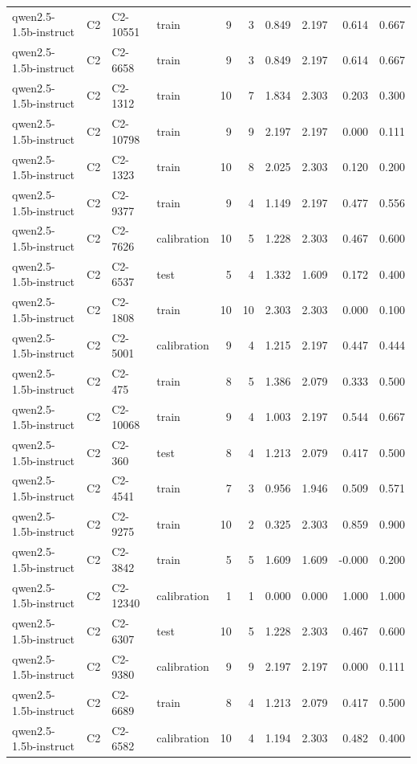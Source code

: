 \begin{table}
\begin{tabular}{llllrrrrrr}
qwen2.5-1.5b-instruct & C2 & C2-10551 & train & 9 & 3 & 0.849 & 2.197 & 0.614 & 0.667 \\
qwen2.5-1.5b-instruct & C2 & C2-6658 & train & 9 & 3 & 0.849 & 2.197 & 0.614 & 0.667 \\
qwen2.5-1.5b-instruct & C2 & C2-1312 & train & 10 & 7 & 1.834 & 2.303 & 0.203 & 0.300 \\
qwen2.5-1.5b-instruct & C2 & C2-10798 & train & 9 & 9 & 2.197 & 2.197 & 0.000 & 0.111 \\
qwen2.5-1.5b-instruct & C2 & C2-1323 & train & 10 & 8 & 2.025 & 2.303 & 0.120 & 0.200 \\
qwen2.5-1.5b-instruct & C2 & C2-9377 & train & 9 & 4 & 1.149 & 2.197 & 0.477 & 0.556 \\
qwen2.5-1.5b-instruct & C2 & C2-7626 & calibration & 10 & 5 & 1.228 & 2.303 & 0.467 & 0.600 \\
qwen2.5-1.5b-instruct & C2 & C2-6537 & test & 5 & 4 & 1.332 & 1.609 & 0.172 & 0.400 \\
qwen2.5-1.5b-instruct & C2 & C2-1808 & train & 10 & 10 & 2.303 & 2.303 & 0.000 & 0.100 \\
qwen2.5-1.5b-instruct & C2 & C2-5001 & calibration & 9 & 4 & 1.215 & 2.197 & 0.447 & 0.444 \\
qwen2.5-1.5b-instruct & C2 & C2-475 & train & 8 & 5 & 1.386 & 2.079 & 0.333 & 0.500 \\
qwen2.5-1.5b-instruct & C2 & C2-10068 & train & 9 & 4 & 1.003 & 2.197 & 0.544 & 0.667 \\
qwen2.5-1.5b-instruct & C2 & C2-360 & test & 8 & 4 & 1.213 & 2.079 & 0.417 & 0.500 \\
qwen2.5-1.5b-instruct & C2 & C2-4541 & train & 7 & 3 & 0.956 & 1.946 & 0.509 & 0.571 \\
qwen2.5-1.5b-instruct & C2 & C2-9275 & train & 10 & 2 & 0.325 & 2.303 & 0.859 & 0.900 \\
qwen2.5-1.5b-instruct & C2 & C2-3842 & train & 5 & 5 & 1.609 & 1.609 & -0.000 & 0.200 \\
qwen2.5-1.5b-instruct & C2 & C2-12340 & calibration & 1 & 1 & 0.000 & 0.000 & 1.000 & 1.000 \\
qwen2.5-1.5b-instruct & C2 & C2-6307 & test & 10 & 5 & 1.228 & 2.303 & 0.467 & 0.600 \\
qwen2.5-1.5b-instruct & C2 & C2-9380 & calibration & 9 & 9 & 2.197 & 2.197 & 0.000 & 0.111 \\
qwen2.5-1.5b-instruct & C2 & C2-6689 & train & 8 & 4 & 1.213 & 2.079 & 0.417 & 0.500 \\
qwen2.5-1.5b-instruct & C2 & C2-6582 & calibration & 10 & 4 & 1.194 & 2.303 & 0.482 & 0.400 \\

\end{tabular}
\end{table}
